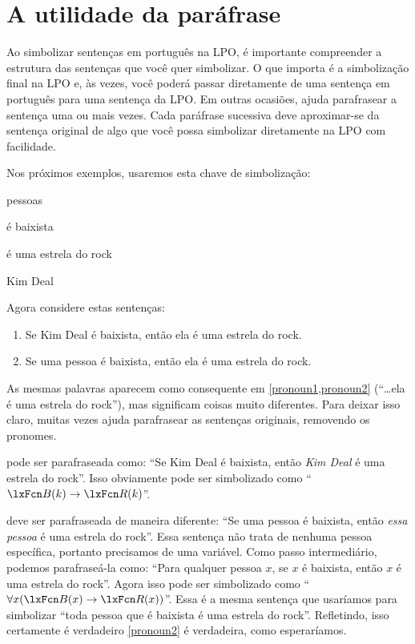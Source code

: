 \section{A utilidade da paráfrase}
Ao simbolizar sentenças em português na LPO, é importante compreender a estrutura das sentenças que você quer simbolizar. O que importa é a simbolização final na LPO e, às vezes, você poderá passar diretamente de uma sentença em português para uma sentença da LPO. Em outras ocasiões, ajuda parafrasear a sentença uma ou mais vezes. Cada paráfrase sucessiva deve aproximar-se da sentença original de algo que você possa simbolizar diretamente na LPO com facilidade.

Nos próximos exemplos, usaremos esta chave de simbolização:
	\begin{ekey}
\item[\text{domínio}] pessoas
\item[\atom{B}{x}]  é baixista
\item[\atom{R}{x}]  é uma estrela do rock
		\item[k] Kim Deal
	\end{ekey}
Agora considere estas sentenças:
	\begin{enumerate}
\item\label{pronoun1} Se Kim Deal é baixista, então ela é uma estrela do rock.
\item\label{pronoun2} Se uma pessoa é baixista, então ela é uma estrela do rock.
	\end{enumerate}
As mesmas palavras aparecem como consequente em \cref*{pronoun1,pronoun2} (\textquotedblleft \ldots ela é uma estrela do rock\textquotedblright{}), mas significam coisas muito diferentes. Para deixar isso claro, muitas vezes ajuda parafrasear as sentenças originais, removendo os pronomes.

 pode ser parafraseada como: \textquotedblleft Se Kim Deal é baixista, então \emph{Kim Deal} é uma estrela do rock\textquotedblright{}. Isso obviamente pode ser simbolizado como \textquotedblleft $\atom{B}{k} \eif \atom{R}{k}$\textquotedblright{}.

 deve ser parafraseada de maneira diferente: \textquotedblleft Se uma pessoa é baixista, então \emph{essa pessoa} é uma estrela do rock\textquotedblright{}. Essa sentença não trata de nenhuma pessoa específica, portanto precisamos de uma variável. Como passo intermediário, podemos parafraseá-la como: \textquotedblleft Para qualquer pessoa $x$, se $x$ é baixista, então $x$ é uma estrela do rock\textquotedblright{}. Agora isso pode ser simbolizado como \textquotedblleft $\forall x (\atom{B}{x} \eif \atom{R}{x})$\textquotedblright{}. Essa é a mesma sentença que usaríamos para simbolizar \textquotedblleft toda pessoa que é baixista é uma estrela do rock\textquotedblright{}. Refletindo, isso certamente é verdadeiro \ifeff{} \cref*{pronoun2} é verdadeira, como esperaríamos.

